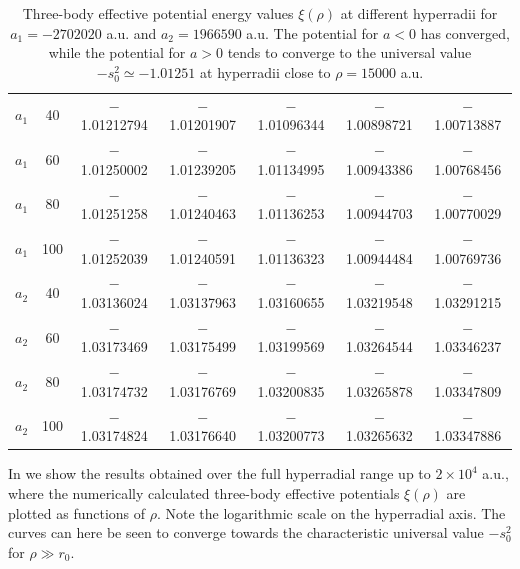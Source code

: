 \begin{table}[h!]
\begin{adjustwidth}{-0.1cm}{}
\begin{tabular}{||c c c c c c c||}
			\hline\hline  \Tstrut\Bstrut 
			$a_1$   & 40  & $-$1.01212794 & $-$1.01201907 & $-$1.01096344 & $-$1.00898721& $-$1.00713887 \\
			$a_1$   & 60  & $-$1.01250002& $-$1.01239205 & $-$1.01134995 & $-$1.00943386 & $-$1.00768456 \\
			$a_1$   & 80 & $-$1.01251258 & $-$1.01240463 & $-$1.01136253 & $-$1.00944703 & $-$1.00770029 \\
			$a_1$   & 100  & $-$1.01252039 & $-$1.01240591 & $-$1.01136323 & $-$1.00944484& $-$1.00769736 \\[0.5ex]
			\hline  \Tstrut\Bstrut 
			$a_2$   & 40 & $-$1.03136024 & $-$1.03137963 & $-$1.03160655 & $-$1.03219548 & $-$1.03291215 \\
			$a_2$   & 60 & $-$1.03173469 & $-$1.03175499 & $-$1.03199569 & $-$1.03264544 & $-$1.03346237 \\
			$a_2$   & 80  & $-$1.03174732 & $-$1.03176769 & $-$1.03200835 & $-$1.03265878 & $-$1.03347809 \\
			$a_2$   & 100 & $-$1.03174824 & $-$1.03176640 & $-$1.03200773 & $-$1.03265632 & $-$1.03347886 \\ [0.7ex] 
			\hline
		\end{tabular}
	\end{adjustwidth}
	\caption{Three-body effective potential energy values $\xi(\rho)$ at different hyperradii for $a_1 = -2702020$ a.u. and $a_2 = 1966590$ a.u. The potential for $a<0$ has converged, while the potential for $a>0$ tends to converge to the universal value $-s_0^2 \simeq -1.01251$ at hyperradii close to $\rho=15000$ a.u.}
	\label{table:Res_2}
\end{table} 

In  we show the results obtained over the full hyperradial range up to $2 \times 10^4$ a.u., where the numerically calculated three-body effective potentials $\xi(\rho)$ are plotted as functions of $\rho$. Note the logarithmic scale on the hyperradial axis. The curves can here be seen to converge towards the characteristic universal value $-s_0^2$ for $\rho \gg r_0$. 

